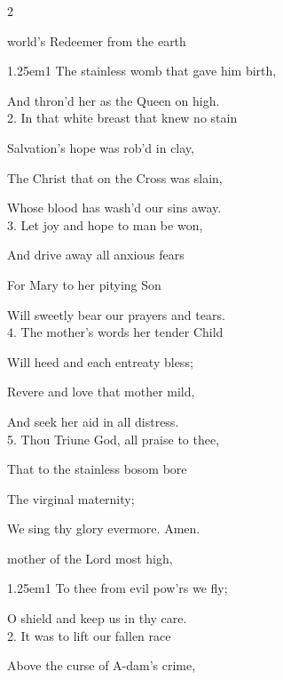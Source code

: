 \begin{paracol}{2}
\sloppy

\mattinsInvitatoryHymn
{} world’s Redeemer from the earth


\begin{hangparas}{1.25em}{1}
The stainless womb that gave him birth,

And thron'd her as the Queen on high.\\

2. In that white breast that knew no stain

Salvation’s hope was rob'd in clay,

The Christ that on the Cross was slain,

Whose blood has wash'd our sins away.\\

3. Let joy and hope to man be won,

And drive away all anxious fears

For Mary to her pitying Son

Will sweetly bear our prayers and tears.\\

4. The mother’s words her tender Child

Will heed and each entreaty bless;

Revere and love that mother mild,

And seek her aid in all distress.\\

5. Thou Triune God, all praise to thee,

That to the stainless bosom bore

The virginal maternity;

We sing thy glory evermore. Amen.
\end{hangparas}

\switchcolumn

\mattinsOfficeHymn
{} mother of the Lord most high,


\begin{hangparas}{1.25em}{1}
To thee from evil pow'rs we fly;

O shield and keep us in thy care.\\

2. It was to lift our fallen race

Above the curse of A-dam's crime,


\end{hangparas}
\end{paracol}
